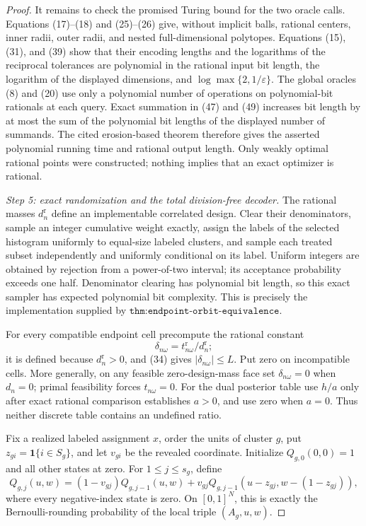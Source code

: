 \documentclass{article}
\begin{document}
\begin{proof}
It remains to check the promised Turing bound for the two oracle calls.  Equations (17)--(18) and (25)--(26) give, without implicit balls, rational centers, inner radii, outer radii, and nested full-dimensional polytopes.  Equations (15), (31), and (39) show that their encoding lengths and the logarithms of the reciprocal tolerances are polynomial in the rational input bit length, the logarithm of the displayed dimensions, and \(\log\max\{2,1/\varepsilon\}\).  The global oracles (8) and (20) use only a polynomial number of operations on polynomial-bit rationals at each query.  Exact summation in (47) and (49) increases bit length by at most the sum of the polynomial bit lengths of the displayed number of summands.  The cited erosion-based theorem therefore gives the asserted polynomial running time and rational output length.  Only weakly optimal rational points were constructed; nothing implies that an exact optimizer is rational.

\emph{Step 5: exact randomization and the total division-free decoder.}
The rational masses \(d_n^{\mathrm r}\) define an implementable correlated design.  Clear their denominators, sample an integer cumulative weight exactly, assign the labels of the selected histogram uniformly to equal-size labeled clusters, and sample each treated subset independently and uniformly conditional on its label.  Uniform integers are obtained by rejection from a power-of-two interval; its acceptance probability exceeds one half.  Denominator clearing has polynomial bit length, so this exact sampler has expected polynomial bit complexity.  This is precisely the implementation supplied by \(\texttt{thm:endpoint-orbit-equivalence}\).

For every compatible endpoint cell precompute the rational constant
\[
 \delta_{n\omega}=t^{\mathrm r}_{n\omega}/d_n^{\mathrm r};
\tag{50}
\]
it is defined because \(d_n^{\mathrm r}>0\), and (34) gives \(|\delta_{n\omega}|\le L\).  Put zero on incompatible cells.  More generally, on any feasible zero-design-mass face set \(\delta_{n\omega}=0\) when \(d_n=0\); primal feasibility forces \(t_{n\omega}=0\).  For the dual posterior table use \(h/a\) only after exact rational comparison establishes \(a>0\), and use zero when \(a=0\).  Thus neither discrete table contains an undefined ratio.

Fix a realized labeled assignment \(x\), order the units of cluster \(g\), put \(z_{gi}=\mathbf 1\{i\in S_g\}\), and let \(v_{gi}\) be the revealed coordinate.  Initialize \(Q_{g,0}(0,0)=1\) and all other states at zero.  For \(1\le j\le s_g\), define
\[
 Q_{g,j}(u,w)
 =(1-v_{gj})Q_{g,j-1}(u,w)
 +v_{gj}Q_{g,j-1}(u-z_{gj},w-(1-z_{gj})),
\tag{51}
\]
where every negative-index state is zero.  On \([0,1]^N\), this is exactly the Bernoulli-rounding probability of the local triple \((A_g,u,w)\).


\end{proof}
\end{document}
